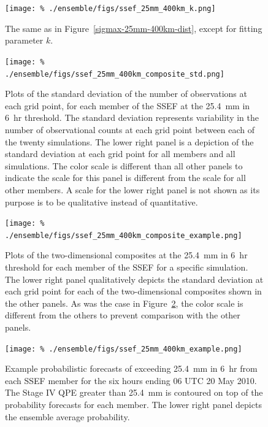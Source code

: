 \clearpage
\begin{figure}[cc]
    \centering
    \texttt{[image: \%
    ./ensemble/figs/ssef\_25mm\_400km\_k.png]}\\
    \caption{The same as in \mbox{Figure \ref{sigmax-25mm-400km-dist}}, except for fitting parameter $k$.}
    \label{k-25mm-400km-dist}
\end{figure}


\clearpage
\begin{figure}[cc]
    \centering
    \texttt{[image: \%
    ./ensemble/figs/ssef\_25mm\_400km\_composite\_std.png]}\\
    \caption{Plots of the standard deviation of the number of observations at each grid point, for each member of the SSEF at the \mbox{25.4 mm} in \mbox{6 hr} threshold.
    The standard deviation represents variability in the number of observational counts at each grid point between each of the twenty simulations.
    The lower right panel is a depiction of the standard deviation at each grid point for all members and all simulations.
    The color scale is different than all other panels to indicate the scale for this panel is different from the scale for all other members.
    A scale for the lower right panel is not shown as its purpose is to be qualitative instead of quantitative.}
    \label{ssef-25mm-400km-std}
\end{figure}


\clearpage
\begin{figure}[cc]
    \centering
    \texttt{[image: \%
    ./ensemble/figs/ssef\_25mm\_400km\_composite\_example.png]}\\
    \caption{Plots of the two-dimensional composites at the \mbox{25.4 mm} in \mbox{6 hr} threshold for each member of the SSEF for a specific simulation.
    The lower right panel qualitatively depicts the standard deviation at each grid point for each of the two-dimensional composites shown in the other panels.
    As was the case in \mbox{Figure \ref{ssef-25mm-400km-std}}, the color scale is different from the others to prevent comparison with the other panels.}
    \label{ssef-25mm-400km-composite}
\end{figure}


\clearpage
\begin{figure}[cc]
    \centering
    \texttt{[image: \%
    ./ensemble/figs/ssef\_25mm\_400km\_example.png]}\\
    \caption{Example probabilistic forecasts of exceeding \mbox{25.4 mm} in \mbox{6 hr} from each SSEF member for the six hours ending 06 UTC 20 May 2010.
    The Stage IV QPE greater than \mbox{25.4 mm} is contoured on top of the probability forecasts for each member.
    The lower right panel depicts the ensemble average probability.}
    \label{ssef-25mm-400km-example}
\end{figure}


